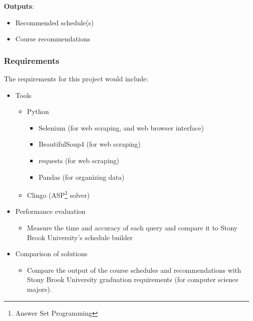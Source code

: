 \documentclass[12pt]{article}
\begin{document}
    \textbf{Outputs}:

    \begin{itemize}
        \label{items:outputs}
        \item Recommended schedule(s)
        \item Course recommendations
    \end{itemize}

    \subsubsection{Requirements}
    \label{subsubsec:reqs}
    The requirements for this project would include:

    \begin{itemize}
        \item Tools
        \begin{itemize}
            \item Python
            \begin{itemize}
                \item Selenium (for web scraping, and web browser interface)
                \item BeautifulSoup4 (for web scraping) 
                \item requests (for web scraping)
                \item Pandas\cite{pandas} (for organizing data)
            \end{itemize}
            \item Clingo (ASP\footnote{Answer Set Programming} solver)\cite{clingo}
        \end{itemize}
        \item Performance evaluation
            \begin{itemize}
                \item Measure the time and accuracy of each query and compare it to Stony Brook University's schedule builder\cite{sched}
            \end{itemize}
        \item Comparison of solutions
            \begin{itemize}
                \item Compare the output of the course schedules and recommendations with Stony Brook University graduation requirements (for computer science majors).
            \end{itemize}
    \end{itemize}
    
\end{document}
